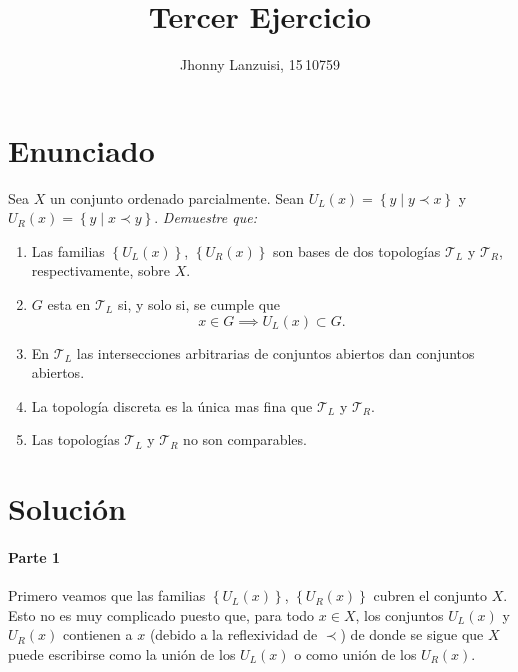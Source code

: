 \documentclass[fleqn,leqno,10pt,letterpaper,draft]{article}
\title{Tercer Ejercicio}
\author{Jhonny Lanzuisi, 15\,10759}
\begin{document}
\maketitle
\tableofcontents
{}

\section[Enunciado]{Enunciado}

Sea $X$ un conjunto ordenado parcialmente. Sean $U_L(x)=\left\{ y\mid y\prec x \right\}$ y
$U_R(x)=\left\{ y\mid x\prec y \right\}$. \textit{Demuestre que:} 
\begin{enumerate}
	\item Las familias $\left\{ U_L(x) \right\}$, $\left\{ U_R(x) \right\}$ son bases de dos topologías
	$\mathcal{T}_L$ y $\mathcal{T}_R$, respectivamente, sobre $X$.
	\item $G$ esta en $\mathcal{T}_L$ si, y solo si, se cumple que 
		\[
			x\in G\implies U_L(x)\subset G.
		\]
	\item En $\mathcal{T}_L$ las intersecciones arbitrarias de conjuntos abiertos
		dan conjuntos abiertos.
	\item La topología discreta es la única mas fina que $\mathcal{T}_L$ y $\mathcal{T}_R$.
	\item Las topologías $\mathcal{T}_L$ y $\mathcal{T}_R$ no son comparables. 
\end{enumerate}

\section{Solución}

\paragraph{Parte 1}%

Primero veamos que las familias $\left\{ U_L(x) \right\}$, $\left\{ U_R(x) \right\}$
cubren el conjunto $X$. Esto no es muy complicado puesto que, para todo $x\in X$,
los conjuntos $ U_L(x) $ y $ U_R(x) $ contienen a $x$ 
(debido a la reflexividad de $\prec$) de donde se sigue que $X$ puede escribirse
como la unión de los $U_L(x)$ o como unión de los $U_R(x)$.
\end{document}
